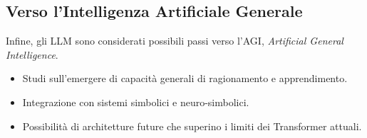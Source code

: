 \subsection{Verso l'Intelligenza Artificiale Generale}
Infine, gli LLM sono considerati possibili passi verso l'AGI, \textit{Artificial General Intelligence}.
\begin{itemize}
    \item Studi sull'emergere di capacità generali di ragionamento e apprendimento.
    \item Integrazione con sistemi simbolici e neuro-simbolici.
    \item Possibilità di architetture future che superino i limiti dei Transformer attuali.
\end{itemize}